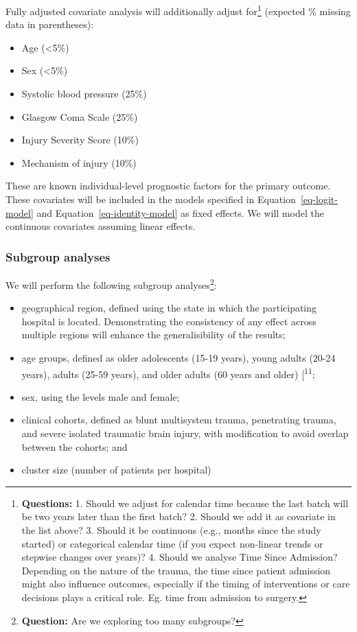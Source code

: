 \documentclass[
]{scrartcl}
\providecommand{\tightlist}{%
  \setlength{\itemsep}{0pt}\setlength{\parskip}{0pt}}\usepackage{longtable,booktabs,array}
\begin{document}
Fully adjusted covariate analysis will additionally adjust
for\footnote{\textbf{Questions:} 1. Should we adjust for calendar time
  because the last batch will be two years later than the first batch?
  2. Should we add it as covariate in the list above? 3. Should it be
  continuous (e.g., months since the study started) or categorical
  calendar time (if you expect non-linear trends or stepwise changes
  over years)? 4. Should we analyse Time Since Admission? Depending on
  the nature of the trauma, the time since patient admission might also
  influence outcomes, especially if the timing of interventions or care
  decisions plays a critical role. Eg. time from admission to surgery.}
(expected \% missing data in parentheses):

\begin{itemize}
\tightlist
\item
  Age (\textless5\%)
\item
  Sex (\textless5\%)
\item
  Systolic blood pressure (25\%)
\item
  Glasgow Coma Scale (25\%)
\item
  Injury Severity Score (10\%)
\item
  Mechanism of injury (10\%)
\end{itemize}

These are known individual-level prognostic factors for the primary
outcome. These covariates will be included in the models specified in
Equation~\ref{eq-logit-model} and Equation~\ref{eq-identity-model} as
fixed effects. We will model the continuous covariates assuming linear
effects.

\hypertarget{subgroup-analyses}{%
\subsubsection{Subgroup analyses}\label{subgroup-analyses}}

We will perform the following subgroup analyses\footnote{\textbf{Question:}
  Are we exploring too many subgroups?}:

\begin{itemize}
\tightlist
\item
  geographical region, defined using the state in which the
  participating hospital is located. Demonstrating the consistency of
  any effect across multiple regions will enhance the generalisibility
  of the results;
\item
  age groups, defined as older adolescents (15-19 years), young adults
  (20-24 years), adults (25-59 years), and older adults (60 years and
  older) {[}\textsuperscript{11};
\item
  sex, using the levels male and female;
\item
  clinical cohorts, defined as blunt multisystem trauma, penetrating
  trauma, and severe isolated traumatic brain injury, with modification
  to avoid overlap between the cohorts; and
\item
  cluster size (number of patients per hospital)
\end{itemize}
\end{document}
